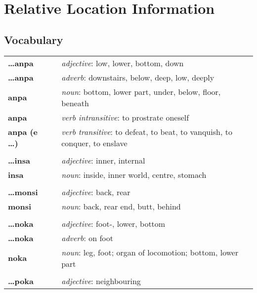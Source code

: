 \section{Relative Location Information}
\subsection*{Vocabulary}
%
\begin{supertabular}{p{2,5cm}|ll}
%
\textbf{\dots anpa} && \textit{adjective}: low, lower, bottom, down \\ %
\textbf{\dots anpa} && \textit{adverb}: downstairs, below, deep, low, deeply \\ %
\textbf{anpa} && \textit{noun}: bottom, lower part, under, below, floor, beneath \\ %
\textbf{anpa} && \textit{verb intransitive}: to prostrate oneself \\ %
\textbf{anpa (e \dots)} && \textit{verb transitive}: to defeat, to beat, to vanquish, to conquer, to enslave \\ %
 && \\ %
%
\textbf{\dots insa} && \textit{adjective}: inner, internal \\ %
\textbf{insa} && \textit{noun}: inside, inner world, centre, stomach \\ %
 && \\ %
%
\textbf{\dots monsi} && \textit{adjective}: back, rear \\ %
\textbf{monsi} && \textit{noun}: back, rear end, butt, behind \\ %
 && \\ %
%
\textbf{\dots noka} && \textit{adjective}: foot-, lower, bottom \\  %
\textbf{ \dots noka } && \textit{adverb}: on foot \\  %
\textbf{noka} && \textit{noun}: leg, foot; organ of locomotion; bottom, lower part \\ %
 && \\ %
%
\textbf{\dots poka} && \textit{adjective}: neighbouring \\ %

\end{supertabular}
